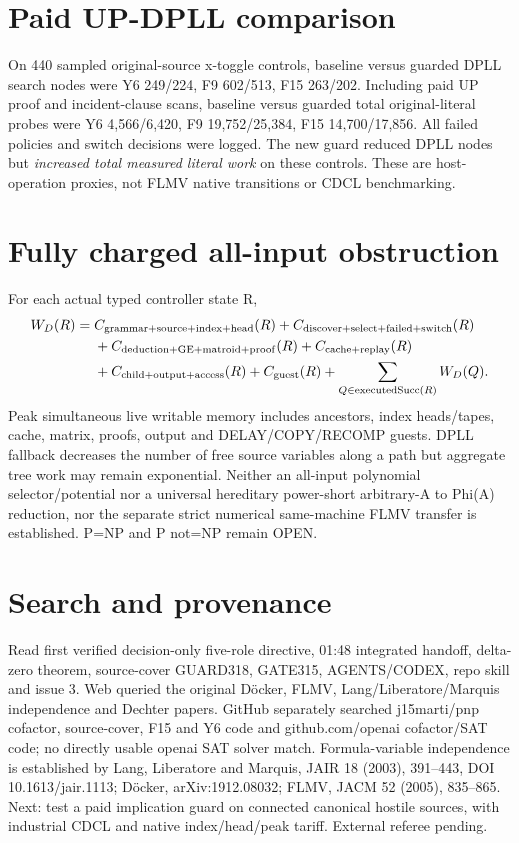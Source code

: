 \documentclass[11pt]{article}
\begin{document}
\section{Paid UP-DPLL comparison}
On 440 sampled original-source x-toggle controls, baseline versus guarded DPLL search nodes were Y6 249/224, F9 602/513, F15 263/202. Including paid UP proof and incident-clause scans, baseline versus guarded total original-literal probes were Y6 4,566/6,420, F9 19,752/25,384, F15 14,700/17,856. All failed policies and switch decisions were logged. The new guard reduced DPLL nodes but \emph{increased total measured literal work} on these controls. These are host-operation proxies, not FLMV native transitions or CDCL benchmarking.
\section{Fully charged all-input obstruction}
For each actual typed controller state R,
\begin{align*}
W_D(R)={}&C_{\rm grammar+source+index+head}(R)+C_{\rm discover+select+failed+switch}(R)\\
&+C_{\rm deduction+GE+matroid+proof}(R)+C_{\rm cache+replay}(R)\\
&+C_{\rm child+output+access}(R)+C_{\rm guest}(R)
+\sum_{Q\in{\rm executedSucc}(R)}W_D(Q).
\end{align*}
Peak simultaneous live writable memory includes ancestors, index heads/tapes, cache, matrix, proofs, output and DELAY/COPY/RECOMP guests. DPLL fallback decreases the number of free source variables along a path but aggregate tree work may remain exponential. Neither an all-input polynomial selector/potential nor a universal hereditary power-short arbitrary-A to Phi(A) reduction, nor the separate strict numerical same-machine FLMV transfer is established. P=NP and P not=NP remain OPEN.
\section{Search and provenance}
Read first verified decision-only five-role directive, 01:48 integrated handoff, delta-zero theorem, source-cover GUARD318, GATE315, AGENTS/CODEX, repo skill and issue 3. Web queried the original D\"ocker, FLMV, Lang/Liberatore/Marquis independence and Dechter papers. GitHub separately searched j15marti/pnp cofactor, source-cover, F15 and Y6 code and github.com/openai cofactor/SAT code; no directly usable openai SAT solver match. Formula-variable independence is established by Lang, Liberatore and Marquis, JAIR 18 (2003), 391--443, DOI 10.1613/jair.1113; D\"ocker, arXiv:1912.08032; FLMV, JACM 52 (2005), 835--865. Next: test a paid implication guard on connected canonical hostile sources, with industrial CDCL and native index/head/peak tariff. External referee pending.
\end{document}
